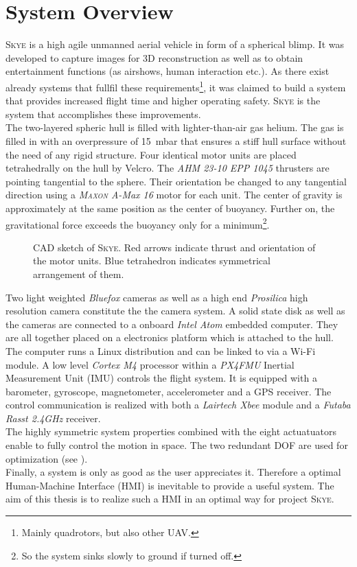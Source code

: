\section{System Overview}
\label{sec:system overview}
\textsc{Skye} is a high agile unmanned aerial vehicle in form of a spherical blimp. It was developed to capture images for 3D reconstruction as well as to obtain entertainment functions (as airshows, human interaction etc.). As there exist already systems that fullfil these requirements\footnote{Mainly quadrotors, but also other UAV.}, it was claimed to build a system that provides increased flight time and higher operating safety. \textsc{Skye} is the system that accomplishes these improvements. \\
The two-layered spheric hull is filled with lighter-than-air gas helium. The gas is filled in with an overpressure of \SI{15}{\milli\bar} that ensures a stiff hull surface without the need of any rigid structure. Four identical motor units are placed tetrahedrally on the hull by Velcro. The \textit{AHM 23-10 EPP 1045} thrusters are pointing tangential to the sphere. Their orientation be changed to any tangential direction using a \textit{\textsc{Maxon} A-Max 16} motor for each unit. The center of gravity is approximately at the same position as the center of buoyancy. Further on, the gravitational force exceeds the buoyancy only for a minimum\footnote{So the system sinks slowly to ground if turned off.}.
\begin{figure}[H]
    \centering
    \def\svgwidth{0.8\columnwidth}
    
    \caption{CAD sketch of \textsc{Skye}. Red arrows indicate thrust and orientation of the motor units. Blue tetrahedron indicates symmetrical arrangement of them. }
    \label{fig:scene_trajectoryFollowing}
\end{figure}
Two light weighted \textit{Bluefox} cameras as well as a high end \textit{Prosilica} high resolution camera constitute the the camera system. A solid state disk as well as the cameras are connected to a onboard \textit{Intel Atom} embedded computer. They are all together placed on a electronics platform which is attached to the hull. The computer runs a Linux distribution and can be linked to via a Wi-Fi module. A low level \textit{Cortex M4} processor within a \textit{PX4FMU} Inertial Measurement Unit (IMU) controls the flight system. It is equipped with a barometer, gyroscope, magnetometer, accelerometer and a GPS receiver. The control communication is realized with both a \textit{Lairtech Xbee} module and a \textit{Futaba Rasst 2.4GHz} receiver. \\
The highly symmetric system properties combined with the eight actuatuators enable to fully control the motion in space. The two redundant DOF are used for optimization (see \cite{schaffnervu}).  \\
Finally, a system is only as good as the user appreciates it. Therefore a optimal Human-Machine Interface (HMI) is inevitable to provide a useful system. The aim of this thesis is to realize such a HMI in an optimal way for project \textsc{Skye}.
